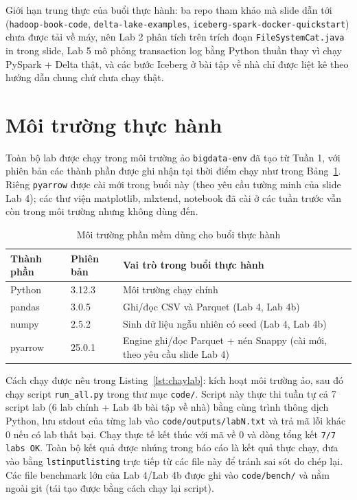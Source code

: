 \documentclass[12pt,a4paper,oneside]{article}
\begin{document}
Giới hạn trung thực của buổi thực hành: ba repo tham khảo mà slide dẫn tới (\texttt{hadoop-book-code}, \texttt{delta-lake-examples}, \texttt{iceberg-spark-docker-quickstart}) chưa được tải về máy, nên Lab 2 phân tích trên trích đoạn \texttt{FileSystemCat.java} in trong slide, Lab 5 mô phỏng transaction log bằng Python thuần thay vì chạy PySpark + Delta thật, và các bước Iceberg ở bài tập về nhà chỉ được liệt kê theo hướng dẫn chung chứ chưa chạy thật.

\section{Môi trường thực hành}

Toàn bộ lab được chạy trong môi trường ảo \texttt{bigdata-env} đã tạo từ Tuần 1, với phiên bản các thành phần được ghi nhận tại thời điểm chạy như trong Bảng~\ref{tab:env}. Riêng \texttt{pyarrow} được cài mới trong buổi này (theo yêu cầu tường minh của slide Lab 4); các thư viện matplotlib, mlxtend, notebook đã cài ở các tuần trước vẫn còn trong môi trường nhưng không dùng đến.

\begin{table}[H]
\centering
\caption{Môi trường phần mềm dùng cho buổi thực hành}
\label{tab:env}
\begin{tabularx}{\textwidth}{l l X}
\toprule
Thành phần & Phiên bản & Vai trò trong buổi thực hành \\
\midrule
Python & 3.12.3 & Môi trường chạy chính \\
pandas & 3.0.5 & Ghi/đọc CSV và Parquet (Lab 4, Lab 4b) \\
numpy & 2.5.2 & Sinh dữ liệu ngẫu nhiên có seed (Lab 4, Lab 4b) \\
pyarrow & 25.0.1 & Engine ghi/đọc Parquet + nén Snappy (cài mới, theo yêu cầu slide Lab 4) \\
\bottomrule
\end{tabularx}
\end{table}

Cách chạy được nêu trong Listing~\ref{lst:chaylab}: kích hoạt môi trường ảo, sau đó chạy script \texttt{run\_all.py} trong thư mục \texttt{code/}. Script này thực thi tuần tự cả 7 script lab (6 lab chính + Lab 4b bài tập về nhà) bằng cùng trình thông dịch Python, lưu stdout của từng lab vào \texttt{code/outputs/labN.txt} và trả mã lỗi khác 0 nếu có lab thất bại. Chạy thực tế kết thúc với mã về 0 và dòng tổng kết \texttt{7/7 labs OK}. Toàn bộ kết quả được nhúng trong báo cáo là kết quả thực chạy, đưa vào bằng \texttt{lstinputlisting} trực tiếp từ các file này để tránh sai sót do chép lại. Các file benchmark lớn của Lab 4/Lab 4b được ghi vào \texttt{code/bench/} và nằm ngoài git (tái tạo được bằng cách chạy lại script).
\end{document}

